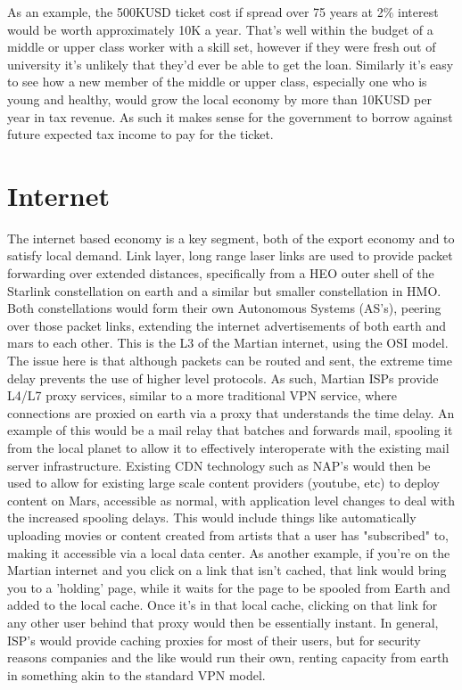 \documentclass[10pt]{article}
\begin{document}
As an example, the 500KUSD ticket cost if spread over 75 years at 2\% interest would be worth approximately 10K a year. That's well within the budget of a middle or upper class worker with a skill set, however if they were fresh out of university it's unlikely that they'd ever be able to get the loan. Similarly it's easy to see how a new member of the middle or upper class, especially one who is young and healthy, would grow the local economy by more than 10KUSD per year in tax revenue. As such it makes sense for the government to borrow against future expected tax income to pay for the ticket.


\section{Internet}
The internet based economy is a key segment, both of the export economy and to satisfy local demand. Link layer, long range laser links are used to provide packet forwarding over extended distances, specifically from a HEO outer shell of the Starlink constellation on earth and a similar but smaller constellation in HMO. Both constellations would form their own Autonomous Systems (AS's), peering over those packet links, extending the internet advertisements of both earth and mars to each other. This is the L3 of the Martian internet, using the OSI model. The issue here is that although packets can be routed and sent, the extreme time delay prevents the use of higher level protocols. As such, Martian ISPs provide L4/L7 proxy services, similar to a more traditional VPN service, where connections are proxied on earth via a proxy that understands the time delay. An example of this would be a mail relay that batches and forwards mail, spooling it from the local planet to allow it to effectively interoperate with the existing mail server infrastructure. Existing CDN technology such as NAP's would then be used to allow for existing large scale content providers (youtube, etc) to deploy content on Mars, accessible as normal, with application level changes to deal with the increased spooling delays. This would include things like automatically uploading movies or content created from artists that a user has "subscribed" to, making it accessible via a local data center. As another example, if you're on the Martian internet and you click on a link that isn't cached, that link would bring you to a 'holding' page, while it waits for the page to be spooled from Earth and added to the local cache. Once it's in that local cache, clicking on that link for any other user behind that proxy would then be essentially instant. In general, ISP's would provide caching proxies for most of their users, but for security reasons companies and the like would run their own, renting capacity from earth in something akin to the standard VPN model.
\end{document}
